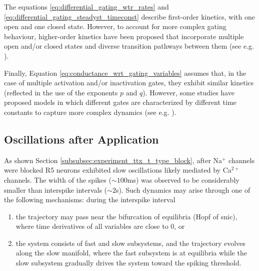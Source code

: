 \documentclass[../main.tex]{subfiles}
\begin{document}
The equations \ref{eq:differential_gating_wtr_rates} and \ref{eq:differential_gating_steadyst_timeconst} describe first-order kinetics, with one open and one
closed state. However, to account for more complex gating behaviour, higher-order kinetics have been proposed that incorporate multiple open and/or closed states and diverse transition pathways
between them (see e.g. \parencite{wangModelTtypeCalcium1991,brunoUsingIndependentOpentoclosed2005}).

Finally, Equation \ref{eq:conductance_wrt_gating_variables} assumes that, in the case of multiple activation and/or inactivation gates, they exhibit similar kinetics (reflected in the use of the exponents $p$ and $q$). However, some studies have proposed models in which different gates are characterized by different time constants to capture more complex dynamics (see e.g. \parencite{destexheModelInwardCurrent1993}).


\subsection{Oscillations after  Application} \label{subsec:math_backg_ttx_oscillations}

As shown Section \ref{subsubsec:experiment_ttx_t_type_block}, after Na$^+$ channels were blocked
R5 neurons exhibited slow oscillations likely mediated by Ca$^{2+}$ channels. The width of the spikes ($\sim 100$ms) was observed to be considerably smaller than interspike intervals ($\sim 2$s).
Such dynamics may arise through one of the following mechanisms: during the interspike interval
\begin{enumerate}
    \item the trajectory may pass near the bifurcation of equilibria (Hopf of \gls{snic}), where time derivatives of all variables are close to $0$, or
    \item the system consists of fast and slow subsystems, and the trajectory evolves along the slow manifold, where the fast subsystem is at equilibria while the slow subsystem gradually drives the system toward the spiking threshold.
\end{enumerate}
\end{document}
